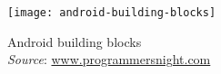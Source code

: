%
%


\begin{frame}[plain]
  
  \begin{figure}
    \centering
    \texttt{[image: android-building-blocks]}
    \caption{Android building blocks \\
      \emph{Source}: \url{www.programmersnight.com}}
    \label{fig:android-stack}
  \end{figure}
  
\end{frame}


